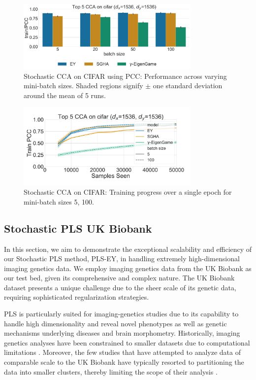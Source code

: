 \begin{figure}
    \centering
    \includegraphics[width=0.8\textwidth]{figures/CCA/cifar_models_different_batch_sizes}
    \caption{Stochastic CCA on CIFAR using PCC: Performance across varying mini-batch sizes. Shaded regions signify \(\pm\) one standard deviation around the mean of 5 runs.}
    \label{fig:corr_cifar}
\end{figure}

\begin{figure}
    \centering
    \includegraphics[width=0.8\textwidth]{figures/CCA/cifar_allbatchsizes_pcc}
    \caption{Stochastic CCA on CIFAR: Training progress over a single epoch for mini-batch sizes 5, 100.}
    \label{fig:learningcurve_cifar}
\end{figure}

\subsection{Stochastic PLS UK Biobank}
In this section, we aim to demonstrate the exceptional scalability and efficiency of our Stochastic PLS method, PLS-EY, in handling extremely high-dimensional imaging genetics data.
We employ imaging genetics data from the UK Biobank \citep{sudlow2015uk} as our test bed, given its comprehensive and complex nature.
The UK Biobank dataset presents a unique challenge due to the sheer scale of its genetic data, requiring sophisticated regularization strategies.

PLS is particularly suited for imaging-genetics studies due to its capability to handle high dimensionality and reveal novel phenotypes as well as genetic mechanisms underlying diseases and brain morphometry.
Historically, imaging genetics analyses have been constrained to smaller datasets due to computational limitations \citep{lorenzi2018,Taquet2021,Lefloch2012}.
Moreover, the few studies that have attempted to analyze data of comparable scale to the UK Biobank have typically resorted to partitioning the data into smaller clusters, thereby limiting the scope of their analysis \citep{lorenzi2017secure, altmann2023tackling}.

